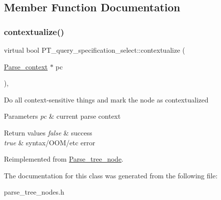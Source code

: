 \subsection{Member Function Documentation}
\mbox{\label{classPT__query__specification__select_a916a44606b98ed38e2112625a991f89b}} 
\subsubsection{\texorpdfstring{contextualize()}{contextualize()}}
{\footnotesize\ttfamily virtual bool P\+T\+\_\+query\+\_\+specification\+\_\+select\+::contextualize (\begin{DoxyParamCaption}\item[{\mbox{\hyperlink{structParse__context}{Parse\+\_\+context}} $\ast$}]{pc }\end{DoxyParamCaption})\hspace{0.3cm}{\ttfamily [inline]}, {\ttfamily [virtual]}}

Do all context-\/sensitive things and mark the node as contextualized


\begin{DoxyParams}{Parameters}
{\em pc} & current parse context\\
\hline
\end{DoxyParams}

\begin{DoxyRetVals}{Return values}
{\em false} & success \\
\hline
{\em true} & syntax/\+O\+O\+M/etc error \\
\hline
\end{DoxyRetVals}


Reimplemented from \mbox{\hyperlink{classParse__tree__node_a22d93524a537d0df652d7efa144f23da}{Parse\+\_\+tree\+\_\+node}}.



The documentation for this class was generated from the following file\+:\begin{DoxyCompactItemize}
\item 
parse\+\_\+tree\+\_\+nodes.\+h\end{DoxyCompactItemize}
